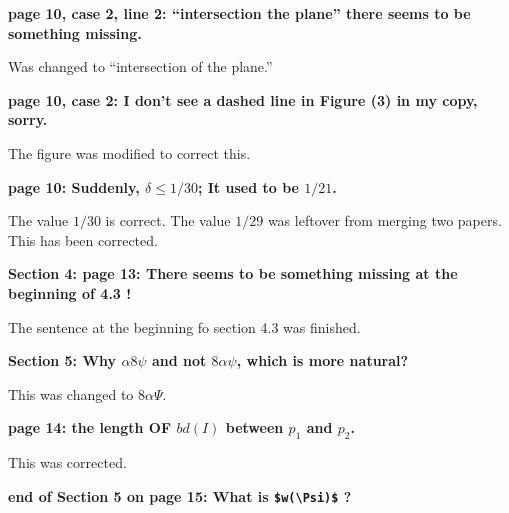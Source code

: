 \documentclass[lotsofwhite]{patmorin}
\newenvironment{comment}{\noindent\bf}{}
\newenvironment{response}{\noindent}{}
\begin{document}
\begin{comment}
page 10, case 2, line 2: ``intersection the plane'' there seems to be something
missing.
\end{comment}

\begin{response}
Was changed to ``intersection of the plane.''
\end{response}

\begin{comment}
page 10, case 2: I don't see a dashed line in Figure (3) in my copy, sorry.\end{comment}

\begin{response}
The figure was modified to correct this.
\end{response}

\begin{comment}
page 10: Suddenly, $\delta \leq 1/30$; It used to be $1/21$.
\end{comment}

\begin{response}
The value $1/30$ is correct.  The value $1/29$ was leftover from
merging two papers. This has been corrected.
\end{response}

\begin{comment}
Section 4: page 13: There seems to be something missing at the
beginning of 4.3 !
\end{comment}

\begin{response}
The sentence at the beginning fo section 4.3 was finished.
\end{response}

\begin{comment}
Section 5: Why $\alpha 8 \psi$ and not $8\alpha\psi$, which is more natural?
\end{comment}

\begin{response}
This was changed to $8\alpha\Psi$.
\end{response}

\begin{comment}
page 14: the length OF $bd(I)$ between $p_1$ and $p_2$.
\end{comment}

\begin{response}
This was corrected.
\end{response}

\begin{comment}
end of Section 5 on page 15: What is \verb+$w(\Psi)$+ ?
\end{comment}
\end{document}
